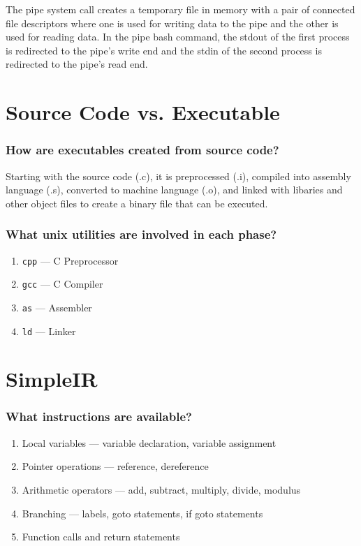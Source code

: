\documentclass{article}
\newcommand{\inlinecode}[1]{\colorbox{gray!20}{\texttt{#1}}}
\begin{document}
The pipe system call creates a temporary file in memory with a pair of connected file descriptors where one is used for writing data to the pipe and the other is used for reading data. In the pipe bash command, the stdout of the first process is redirected to the pipe's write end and the stdin of the second process is redirected to the pipe's read end.

\section*{Source Code vs. Executable}

\subsubsection*{How are executables created from source code?}

Starting with the source code (.c), it is preprocessed (.i), compiled into assembly language (.s), converted to machine language (.o), and linked with libaries and other object files to create a binary file that can be executed.

\subsubsection*{What unix utilities are involved in each phase?}

\begin{enumerate}
    \item \inlinecode{cpp} --- C Preprocessor
    \item \inlinecode{gcc} --- C Compiler
    \item \inlinecode{as} --- Assembler
    \item \inlinecode{ld} --- Linker
\end{enumerate}

\section*{SimpleIR}

\subsubsection*{What instructions are available?}

\begin{enumerate}
    \item Local variables --- variable declaration, variable assignment
    \item Pointer operations --- reference, dereference
    \item Arithmetic operators --- add, subtract, multiply, divide, modulus
    \item Branching --- labels, goto statements, if goto statements
    \item Function calls and return statements
\end{enumerate}
\end{document}
